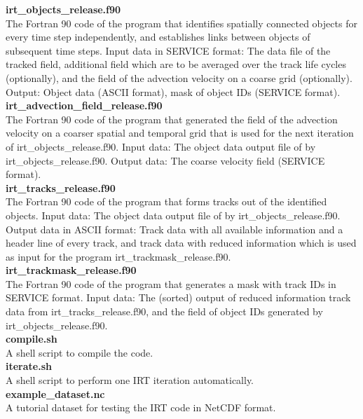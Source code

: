 \documentclass[11pt]{article}
\begin{document}
{\bf irt\_objects\_release.f90}\\
The Fortran 90 code of the program that identifies spatially connected objects for every time step independently, and establishes links between objects of subsequent time steps. Input data in SERVICE format: The data file of the tracked field, additional field which are to be averaged over the track life cycles (optionally), and the field of the advection velocity on a coarse grid (optionally). Output: Object data (ASCII format), mask of object IDs (SERVICE format). \vspace{0.5cm} \\
{\bf irt\_advection\_field\_release.f90}\\
The Fortran 90 code of the program that generated the field of the advection velocity on a coarser spatial and temporal grid that is used for the next iteration of irt\_objects\_release.f90. Input data: The object data output file of by irt\_objects\_release.f90. Output data: The coarse velocity field (SERVICE format). \vspace{0.5cm} \\
{\bf irt\_tracks\_release.f90}\\
The Fortran 90 code of the program that forms tracks out of the identified objects. Input data: The object data output file of by irt\_objects\_release.f90. Output data in ASCII format: Track data with all available information and a header line of every track, and track data with reduced information which is used as input for the program irt\_trackmask\_release.f90. \vspace{0.5cm} \\
{\bf irt\_trackmask\_release.f90}\\
The Fortran 90 code of the program that generates a mask with track IDs in SERVICE format. Input data: The (sorted) output of reduced information track data from irt\_tracks\_release.f90, and the field of object IDs generated by irt\_objects\_release.f90. \vspace{0.5cm} \\
{\bf compile.sh}\\
A shell script to compile the code. \vspace{0.5cm} \\
{\bf iterate.sh}\\
A shell script to perform one IRT iteration automatically. \vspace{0.5cm} \\
{\bf example\_dataset.nc}\\
A tutorial dataset for testing the IRT code in NetCDF format.
\end{document}
